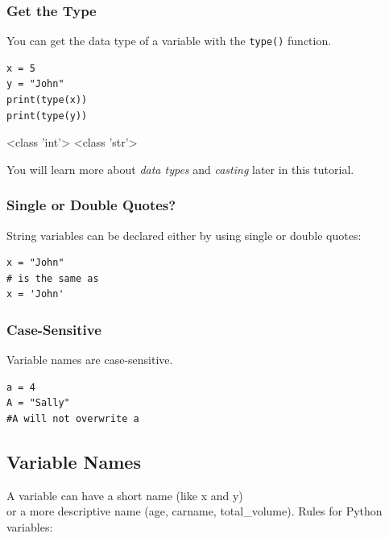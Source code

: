 \documentclass[12pt,a4paper]{article}
\newcommand{\code}[1]{%
	\colorbox{backcolour}{\lstinline{#1}}%
}
\begin{document}
\subsubsection{Get the Type}
You can get the data type of a variable with the \code{type()} function.

\begin{ebox}
	\begin{lstlisting}
x = 5
y = "John"
print(type(x))
print(type(y))
	\end{lstlisting}
\tcblower
	\begin{vercode}
<class 'int'>
<class 'str'>
	\end{vercode}
\end{ebox}

\begin{nbox}
	You will learn more about \textit{data types} and \textit{casting} later in this tutorial.
\end{nbox}
\subsubsection{Single or Double Quotes?}
String variables can be declared either by using single or double quotes:

\begin{ebox}
	\begin{lstlisting}
x = "John"
# is the same as
x = 'John'
	\end{lstlisting}
\end{ebox}
\subsubsection{Case-Sensitive}

Variable names are case-sensitive.

\begin{ebox}
	\begin{lstlisting}
a = 4
A = "Sally"
#A will not overwrite a
	\end{lstlisting}
\end{ebox}
\subsection{Variable Names}
A variable can have a short name (like x and y)\\
or a more descriptive name
(age, carname, total\_volume).
Rules for Python variables:
\end{document}
